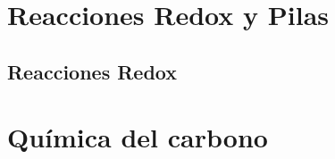 \documentclass[
    11pt, %
    a4paper, %
]{

}
\begin{document}
    

    \newpage

    




    \part{Reacciones Redox y Pilas}


    \chapterspaceabove{6.75cm} %
    \chapterspacebelow{7.25cm} %


%

    \chapter{Reacciones Redox}

    

    \newpage

    



    \part{Química del carbono}


    \chapterspaceabove{6.75cm} %
    \chapterspacebelow{7.25cm} %
\end{document}
